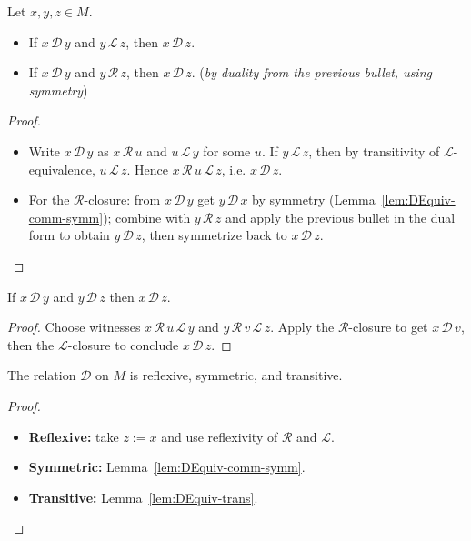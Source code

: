 \begin{lemma}
\label{lem:DEquiv-closures}
Let \(x,y,z\in M\).
\begin{itemize}
  \item If \(x \,\mathcal D\, y\) and \(y \,\mathcal L\, z\), then \(x \,\mathcal D\, z\).
  \item If \(x \,\mathcal D\, y\) and \(y \,\mathcal R\, z\), then \(x \,\mathcal D\, z\). \hfill(\emph{by duality from the previous bullet, using symmetry})
\end{itemize}
\leanok
{}
\end{lemma}
\begin{proof}
\leanok
\begin{itemize}
  \item Write \(x \,\mathcal D\, y\) as \(x \,\mathcal R\, u\) and \(u \,\mathcal L\, y\) for some \(u\).
        If \(y \,\mathcal L\, z\), then by transitivity of \(\mathcal L\)-equivalence,
        \(u \,\mathcal L\, z\). Hence \(x \,\mathcal R\, u \,\mathcal L\, z\), i.e. \(x \,\mathcal D\, z\).
  \item For the \(\mathcal R\)-closure: from \(x \,\mathcal D\, y\) get \(y \,\mathcal D\, x\) by symmetry
        (Lemma~\ref{lem:DEquiv-comm-symm}); combine with \(y \,\mathcal R\, z\) and apply the previous bullet
        in the dual form to obtain \(y \,\mathcal D\, z\), then symmetrize back to \(x \,\mathcal D\, z\).
\end{itemize}
\end{proof}

\begin{lemma}
\label{lem:DEquiv-trans}
If \(x \,\mathcal D\, y\) and \(y \,\mathcal D\, z\) then \(x \,\mathcal D\, z\).
\leanok
{}
\end{lemma}
\begin{proof}
\leanok
Choose witnesses \(x \,\mathcal R\, u \,\mathcal L\, y\) and \(y \,\mathcal R\, v \,\mathcal L\, z\).
Apply the \(\mathcal R\)-closure to get \(x \,\mathcal D\, v\), then the \(\mathcal L\)-closure to conclude \(x \,\mathcal D\, z\).
\end{proof}

\begin{lemma}
\label{lem:DEquiv-isEquiv}
The relation \(\mathcal D\) on \(M\) is reflexive, symmetric, and transitive.
\leanok
{}
\end{lemma}
\begin{proof}
\leanok
\begin{itemize}
  \item \textbf{Reflexive:} take \(z:=x\) and use reflexivity of \(\mathcal R\) and \(\mathcal L\).
  \item \textbf{Symmetric:} Lemma~\ref{lem:DEquiv-comm-symm}.
  \item \textbf{Transitive:} Lemma~\ref{lem:DEquiv-trans}.
\end{itemize}
\end{proof}